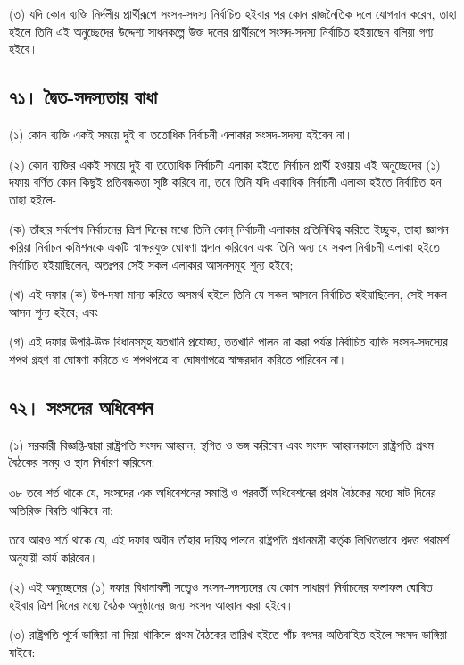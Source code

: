\documentclass[11pt]{article}
\begin{document}
(৩) যদি কোন ব্যক্তি নির্দলীয় প্রার্থীরূপে সংসদ-সদস্য নির্বাচিত হইবার পর কোন
    রাজনৈতিক দলে যোগদান করেন, তাহা হইলে তিনি এই অনুচ্ছেদের উদ্দেশ্য সাধনকল্পে
    উক্ত দলের প্রার্থীরূপে সংসদ-সদস্য নির্বাচিত হইয়াছেন বলিয়া গণ্য হইবে।

\subsection{৭১। দ্বৈত-সদস্যতায় বাধা}
\label{sec:org08ccaad}
(১) কোন ব্যক্তি একই সময়ে দুই বা ততোধিক নির্বাচনী এলাকার সংসদ-সদস্য হইবেন
    না।

(২) কোন ব্যক্তির একই সময়ে দুই বা ততোধিক নির্বাচনী এলাকা হইতে নির্বাচন
    প্রার্থী হওয়ায় এই অনুচ্ছেদের (১) দফায় বর্ণিত কোন কিছুই প্রতিবন্ধকতা সৃষ্টি করিবে
    না, তবে তিনি যদি একাধিক নির্বাচনী এলাকা হইতে নির্বাচিত হন তাহা হইলে-

(ক) তাঁহার সর্বশেষ নির্বাচনের ত্রিশ দিনের মধ্যে তিনি কোন্ নির্বাচনী এলাকার
    প্রতিনিধিত্ব করিতে ইচ্ছুক, তাহা জ্ঞাপন করিয়া নির্বাচন কমিশনকে একটি স্বাক্ষরযুক্ত
    ঘোষণা প্রদান করিবেন এবং তিনি অন্য যে সকল নির্বাচনী এলাকা হইতে নির্বাচিত
    হইয়াছিলেন, অতঃপর সেই সকল এলাকার আসনসমূহ শূন্য হইবে;

(খ) এই দফার (ক) উপ-দফা মান্য করিতে অসমর্থ হইলে তিনি যে সকল আসনে নির্বাচিত
    হইয়াছিলেন, সেই সকল আসন শূন্য হইবে; এবং

(গ) এই দফার উপরি-উক্ত বিধানসমূহ যতখানি প্রযোজ্য, ততখানি পালন না করা পর্যন্ত
    নির্বাচিত ব্যক্তি সংসদ-সদস্যের শপথ গ্রহণ বা ঘোষণা করিতে ও শপথপত্রে বা
    ঘোষণাপত্রে স্বাক্ষরদান করিতে পারিবেন না।

\subsection{৭২। সংসদের অধিবেশন}
\label{sec:org7294672}
(১) সরকারী বিজ্ঞপ্তি-দ্বারা রাষ্ট্রপতি সংসদ আহ্বান, স্থগিত ও ভঙ্গ করিবেন এবং
    সংসদ আহ্বানকালে রাষ্ট্রপতি প্রথম বৈঠকের সময় ও স্থান নির্ধারণ করিবেন:

৩৮ তবে শর্ত থাকে যে, সংসদের এক অধিবেশনের সমাপ্তি ও পরবর্তী অধিবেশনের প্রথম
বৈঠকের মধ্যে ষাট দিনের অতিরিক্ত বিরতি থাকিবে না:

তবে আরও শর্ত থাকে যে, এই দফার অধীন তাঁহার দায়িত্ব পালনে রাষ্ট্রপতি
প্রধানমন্ত্রী কর্তৃক লিখিতভাবে প্রদত্ত পরামর্শ অনুযায়ী কার্য করিবেন।

(২) এই অনুচ্ছেদের (১) দফার বিধানাবলী সত্ত্বেও সংসদ-সদস্যদের যে কোন সাধারণ
    নির্বাচনের ফলাফল ঘোষিত হইবার ত্রিশ দিনের মধ্যে বৈঠক অনুষ্ঠানের জন্য সংসদ
    আহ্বান করা হইবে।

(৩) রাষ্ট্রপতি পূর্বে ভাঙ্গিয়া না দিয়া থাকিলে প্রথম বৈঠকের তারিখ হইতে পাঁচ
    বৎসর অতিবাহিত হইলে সংসদ ভাঙ্গিয়া যাইবে:
\end{document}
